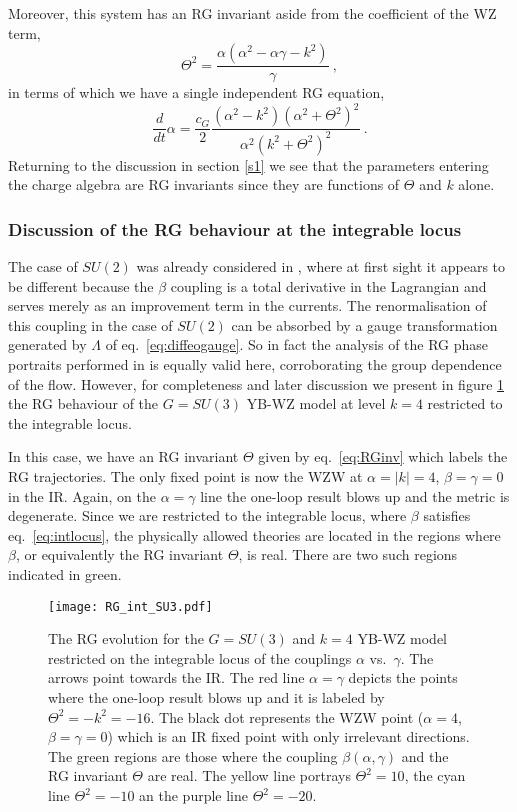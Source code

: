 \documentclass[12pt]{article}
\def\ee{\boldsymbol{e}}
\def\be{\begin{equation}}
\def\ee{\end{equation}}
\begin{document}
\noindent Moreover, this system has an  RG invariant aside from the coefficient  of the WZ term,
      \be \label{eq:RGinv}
\Theta^2 = \frac{\alpha  \left(\alpha ^2-\alpha  \gamma -k^2\right)}{\gamma } \ ,
      \ee
 in terms of which we have a single independent RG equation,  
 \be
\frac{d}{dt}\alpha =   \frac{c_G}{2} \frac{ ( \alpha^2 -k^2 )   \left(\alpha ^2+\Theta^2\right)^2}{\alpha ^2
   \left(k^2+\Theta^2\right)^2} \ .
   \ee
Returning to the discussion in section \ref{s1} we see that the parameters entering the charge algebra are RG invariants since they are functions of $\Theta$ and $k$ alone.

\subsubsection*{Discussion of the RG behaviour at  the integrable locus} 

The case of $SU(2)$ was already considered in \cite{Kawaguchi:2011mz}, where at first sight it appears to be different because the $\beta$ coupling is a total derivative in the Lagrangian and serves merely as an improvement term in the currents. The renormalisation of this coupling in the case of $SU(2)$ can be absorbed by a gauge transformation generated by $\Lambda$ of eq.~\eqref{eq:diffeogauge}. So in fact the analysis of the RG phase portraits performed in \cite{Kawaguchi:2011mz} is equally valid here, corroborating the group dependence of the flow. However, for completeness and later discussion we present in figure \ref{fig:RGint} the RG behaviour of the $G=SU(3)$ YB-WZ model at level $k=4$ restricted to the integrable locus. 

In this case, we have an RG invariant $\Theta$ given by eq.\ \eqref{eq:RGinv} which labels the RG trajectories. The only fixed point is now the WZW at $\alpha=|k| =4$, $\beta=\gamma=0$ in the IR. Again, on the $\alpha = \gamma$ line the one-loop result blows up and the metric is degenerate. Since we are restricted to the integrable locus, where $\beta$ satisfies eq.\ \eqref{eq:intlocus}, the physically allowed theories are located in the regions where $\beta$, or equivalently the RG invariant $\Theta$, is real. There are two such regions indicated in green.
  
\begin{figure}[H]
\centering
\texttt{[image: RG\_int\_SU3.pdf]}
\caption{The RG evolution for the $G=SU(3)$ and $k=4$ YB-WZ model restricted on the integrable locus of the couplings $\alpha$ vs.\ $\gamma$. The arrows point towards the IR. The red line $\alpha=\gamma$ depicts the points where the one-loop result blows up and it is labeled by $\Theta^{2}=-k^{2}=-16$. The black dot represents the WZW point ($\alpha=4$, $\beta=\gamma=0$) which is an IR fixed point with only irrelevant directions. The green regions are those where the coupling $\beta(\alpha,\gamma)$ and the RG invariant $\Theta$ are real. The yellow line portrays $\Theta^{2} = 10$, the cyan line $\Theta^{2}=-10$ an the purple line $\Theta^{2}=-20$.}\label{fig:RGint}
\end{figure}
\end{document}
